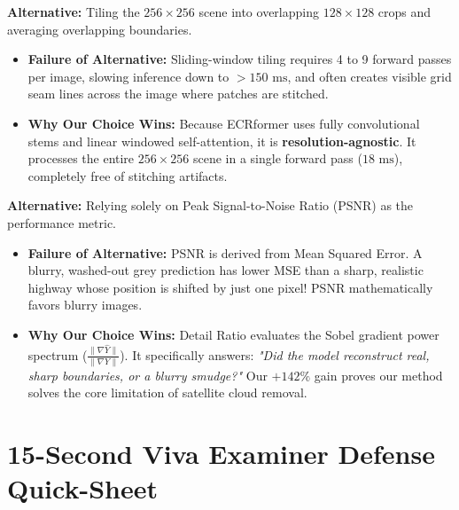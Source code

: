 \documentclass[11pt,a4paper]{article}
\begin{document}
\begin{tcolorbox}[colback=white,colframe=secondary,title=\textbf{2. Why Native Full-Scene ($256 \times 256$) Inference over Sliding-Window Tiling?}]
\textbf{Alternative:} Tiling the $256 \times 256$ scene into overlapping $128 \times 128$ crops and averaging overlapping boundaries.
\begin{itemize}[leftmargin=1.2em, itemsep=0.2em]
    \item \textbf{Failure of Alternative:} Sliding-window tiling requires 4 to 9 forward passes per image, slowing inference down to $>150\text{ ms}$, and often creates visible grid seam lines across the image where patches are stitched.
    \item \textbf{Why Our Choice Wins:} Because ECRformer uses fully convolutional stems and linear windowed self-attention, it is \textbf{resolution-agnostic}. It processes the entire $256 \times 256$ scene in a single forward pass ($18\text{ ms}$), completely free of stitching artifacts.
\end{itemize}
\end{tcolorbox}

\begin{tcolorbox}[colback=white,colframe=primary,title=\textbf{3. Why Detail Ratio (DR) \& Edge Correlation over PSNR Alone?}]
\textbf{Alternative:} Relying solely on Peak Signal-to-Noise Ratio (PSNR) as the performance metric.
\begin{itemize}[leftmargin=1.2em, itemsep=0.2em]
    \item \textbf{Failure of Alternative:} PSNR is derived from Mean Squared Error. A blurry, washed-out grey prediction has lower MSE than a sharp, realistic highway whose position is shifted by just one pixel! PSNR mathematically favors blurry images.
    \item \textbf{Why Our Choice Wins:} Detail Ratio evaluates the Sobel gradient power spectrum ($\frac{\|\nabla \hat{Y}\|}{\|\nabla Y\|}$). It specifically answers: \textit{"Did the model reconstruct real, sharp boundaries, or a blurry smudge?"} Our $+142\%$ gain proves our method solves the core limitation of satellite cloud removal.
\end{itemize}
\end{tcolorbox}

\section{15-Second Viva Examiner Defense Quick-Sheet}
\end{document}
